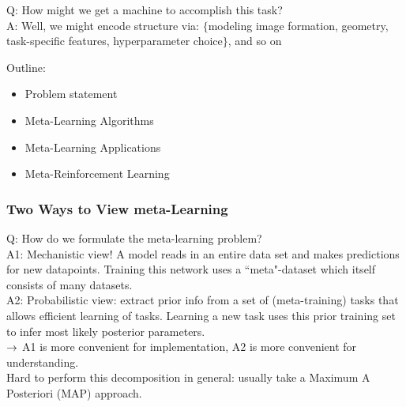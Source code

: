 Q: How might we get a machine to accomplish this task?  \\

A: Well, we might encode structure via: $\{$modeling image formation, geometry, task-specific features, hyperparameter choice$\}$, and so on \\


Outline:
\begin{itemize}
\item Problem statement
\item Meta-Learning Algorithms
\item Meta-Learning Applications
\item Meta-Reinforcement Learning
\end{itemize}

\subsubsection{Two Ways to View meta-Learning}

Q: How do we formulate the meta-learning problem? \\

A1: Mechanistic view! A model reads in an entire data set and makes predictions for new datapoints. Training this network uses a ``meta"-dataset which itself consists of many datasets. \\

A2: Probabilistic view: extract prior info from a set of (meta-training) tasks that allows efficient learning of tasks. Learning a new task uses this prior training set to infer most likely posterior parameters. \\

$\rightarrow$ A1 is more convenient for implementation, A2 is more convenient for understanding. \\

Hard to perform this decomposition in general: usually take a Maximum A Posteriori (MAP) approach. \\

